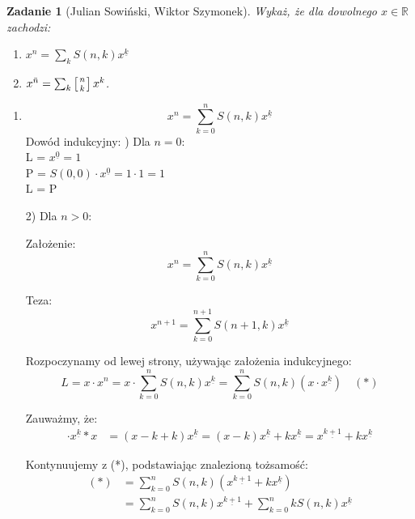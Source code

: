 \documentclass{mwart}
\newtheorem{zad}{Zadanie}[section]
\begin{document}
\begin{zad}[Julian Sowiński, Wiktor Szymonek]
    Wykaż, że dla dowolnego $x \in \mathbb{R}$ zachodzi:
    \begin{enumerate}
        \item $x^n = \sum_{k}S(n,k) x^{\underline{k}}$
        \item $x^{\bar{n}} = \sum_{k} \left[n \atop k \right] x^k$.
    \end{enumerate}
\end{zad}
\begin{mdframed}
    \begin{enumerate}
        \item
              $$x^n = \sum_{k=0}^n S(n,k) x^{\underline{k}}$$
              Dowód indukcyjny:
              \newline {}) Dla $n=0$: \\
              L = $x^{\underline{0}} = 1$ \\
              P = $S(0,0) \cdot x^{\underline{0}} = 1 \cdot 1 = 1$ \\
              L = P

              2) Dla $n>0$:

              Założenie: $$x^n = \sum_{k=0}^n S(n,k) x^{\underline{k}}$$

              Teza: $$x^{n+1} = \sum_{k=0}^{n+1} S(n+1,k) x^{\underline{k}}$$

              Rozpoczynamy od lewej strony, używając założenia indukcyjnego:
              $$L = x \cdot x^n = x \cdot \sum_{k=0}^n S(n,k) x^{\underline{k}} = \sum_{k=0}^n S(n,k) (x \cdot x^{\underline{k}}) \quad (*)$$

              Zauważmy, że:
              \begin{align*}
                  \cdot x^{\underline{k}}*x & = (x-k+k) x^{\underline{k}} = (x-k) x^{\underline{k}} + k x^{\underline{k}} = x^{\underline{k+1}} + k x^{\underline{k}}
              \end{align*}

              Kontynuujemy z (*), podstawiając znalezioną tożsamość:
              \begin{align*}
                  (*) & = \sum_{k=0}^n S(n,k) (x^{\underline{k+1}} + k x^{\underline{k}})                   \\
                      & = \sum_{k=0}^n S(n,k) x^{\underline{k+1}} + \sum_{k=0}^n k S(n,k) x^{\underline{k}}
              \end{align*}


\end{enumerate}
\end{mdframed}
\end{document}

